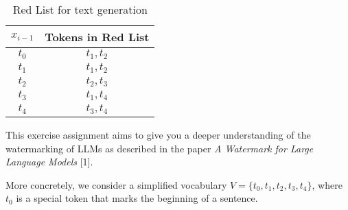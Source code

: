 \documentclass{article}
\begin{document}
\begin{table}[h]
    \centering
    \caption{Red List for text generation}
    \begin{tabular}{|c|c|}
        \hline
        $x_{i-1}$ & Tokens in Red List \\ \hline
        $t_0$     & $t_1, t_2$         \\ \hline
        $t_1$     & $t_1, t_2$         \\ \hline
        $t_2$     & $t_2, t_3$         \\ \hline
        $t_3$     & $t_1, t_4$         \\ \hline
        $t_4$     & $t_3, t_4$         \\ \hline
    \end{tabular}
\end{table}

This exercise assignment aims to give you a deeper understanding of the watermarking of LLMs as described in the paper \textit{A Watermark for Large Language Models} [1].

More concretely, we consider a simplified vocabulary $V = \{t_0, t_1, t_2, t_3, t_4\}$, where $t_0$ is a special token that marks the beginning of a sentence.
\end{document}
